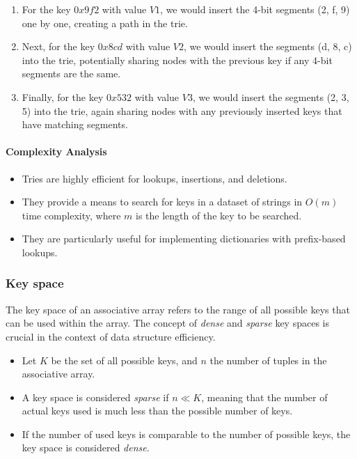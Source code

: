 \documentclass[12pt]{article}
\begin{document}
\begin{enumerate}
    \item For the key \(0x9f2\) with value \(V1\), we would insert the 4-bit segments (2, f, 9) one by one, creating a path in the trie.
    \item Next, for the key \(0x8cd\) with value \(V2\), we would insert the segments (d, 8, c) into the trie, potentially sharing nodes with the previous key if any 4-bit segments are the same.
    \item Finally, for the key \(0x532\) with value \(V3\), we would insert the segments (2, 3, 5) into the trie, again sharing nodes with any previously inserted keys that have matching segments.
\end{enumerate}


\paragraph{Complexity Analysis}
\begin{itemize}
    \item Tries are highly efficient for lookups, insertions, and deletions.
    \item They provide a means to search for keys in a dataset of strings in \(O(m)\) time complexity, where \(m\) is the length of the key to be searched.
    \item They are particularly useful for implementing dictionaries with prefix-based lookups.
\end{itemize}


\subsubsection{Key space}
The key space of an associative array refers to the range of all possible keys that can be used within the array. The concept of \emph{dense} and \emph{sparse} key spaces is crucial in the context of data structure efficiency.

\begin{itemize}
    \item Let \( K \) be the set of all possible keys, and \( n \) the number of tuples in the associative array.
    \item A key space is considered \emph{sparse} if \( n \ll K \), meaning that the number of actual keys used is much less than the possible number of keys.
    \item If the number of used keys is comparable to the number of possible keys, the key space is considered \emph{dense}.
\end{itemize}
\end{document}
